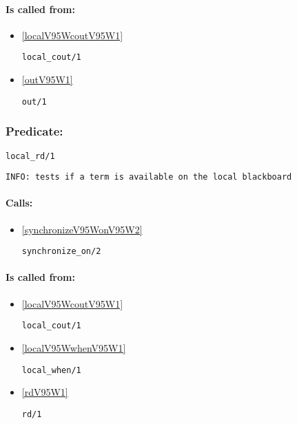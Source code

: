 \paragraph{Is called from:} 
\begin{itemize}
\item \ref{localV95WcoutV95W1} 
\begin{verbatim}
local_cout/1
\end{verbatim}

\item \ref{outV95W1} 
\begin{verbatim}
out/1
\end{verbatim}

\end{itemize}

\subsubsection{Predicate:} \label{localV95WrdV95W1}

\begin{verbatim}
local_rd/1
\end{verbatim}

{\small \begin{verbatim}
INFO: tests if a term is available on the local blackboard

\end{verbatim}}
\paragraph{Calls:} 
\begin{itemize}
\item \ref{synchronizeV95WonV95W2} 
\begin{verbatim}
synchronize_on/2
\end{verbatim}

\end{itemize}
\paragraph{Is called from:} 
\begin{itemize}
\item \ref{localV95WcoutV95W1} 
\begin{verbatim}
local_cout/1
\end{verbatim}

\item \ref{localV95WwhenV95W1} 
\begin{verbatim}
local_when/1
\end{verbatim}

\item \ref{rdV95W1} 
\begin{verbatim}
rd/1
\end{verbatim}

\end{itemize}

